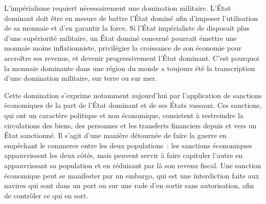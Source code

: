 L'impérialisme requiert nécessairement une domination militaire. L'État dominant doit être en mesure de battre l'État dominé afin d'imposer l'utilisation de sa monnaie et d'en garantir la force. Si l'État impérialiste de disposait plus d'une supériorité militaire, un État dominé concerné pourrait émettre une monnaie moins inflationniste, privilégier la croissance de son économie pour accroître ses revenus, et devenir progressivement l'État dominant. C'est pourquoi la monnaie dominante dans une région du monde a toujours été la transcription d'une domination militaire, sur terre ou sur mer.



Cette domination s'exprime notamment aujourd'hui par l'application de sanctions économiques de la part de l'État dominant et de ses États vassaux. Ces sanctions, qui ont un caractère politique et non économique, consistent à restreindre la circulations des biens, des personnes et les transferts financiers depuis et vers un État sanctionné. Il s'agit d'une manière détournée de faire la guerre en empêchant le commerce entre les deux populations~: les sanctions économiques appauvrissent les deux côtés, mais peuvent servir à faire capituler l'autre en appauvrissant sa population et en réduisant par là son revenu fiscal. Une sanction économique peut se manifester par un embargo, qui est une interdiction faite aux navires qui sont dans un port ou sur une rade d'en sortir sans autorisation, afin de contrôler ce qui en sort.

